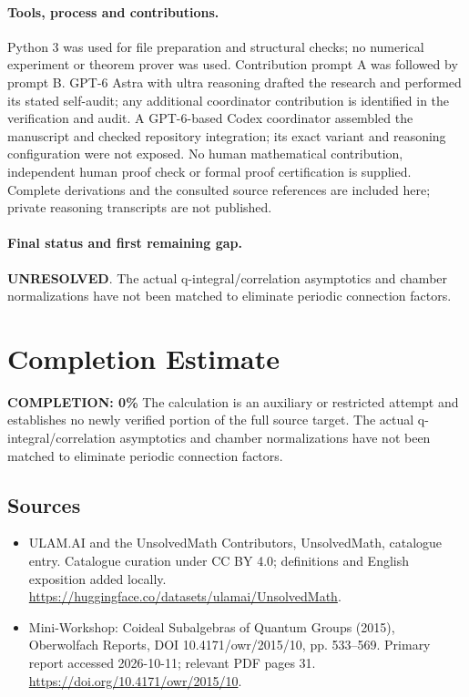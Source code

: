 \documentclass[11pt]{article}
\begin{document}
\paragraph{Tools, process and contributions.}
Python 3 was used for file preparation and structural checks; no numerical experiment or theorem prover was used. Contribution prompt A was followed by prompt B. GPT-6 Astra with ultra reasoning drafted the research and performed its stated self-audit; any additional coordinator contribution is identified in the verification and audit. A GPT-6-based Codex coordinator assembled the manuscript and checked repository integration; its exact variant and reasoning configuration were not exposed. No human mathematical contribution, independent human proof check or formal proof certification is supplied. Complete derivations and the consulted source references are included here; private reasoning transcripts are not published.

\paragraph{Final status and first remaining gap.}
\textbf{UNRESOLVED}. The actual q-integral/correlation asymptotics and chamber normalizations have not been matched to eliminate periodic connection factors.

\section{Completion Estimate}
\noindent\textbf{COMPLETION: 0\%}
The calculation is an auxiliary or restricted attempt and establishes no newly verified portion of the full source target. The actual q-integral/correlation asymptotics and chamber normalizations have not been matched to eliminate periodic connection factors.

\subsection{Sources}
\begin{itemize}
\item[\hypertarget{source:statement:1}{S1}] ULAM.AI and the UnsolvedMath Contributors, UnsolvedMath, catalogue entry. Catalogue curation under CC BY 4.0; definitions and English exposition added locally.
\url{https://huggingface.co/datasets/ulamai/UnsolvedMath}.
\item[\hypertarget{source:statement:2}{S2}] Mini-Workshop: Coideal Subalgebras of Quantum Groups (2015), Oberwolfach Reports, DOI 10.4171/owr/2015/10, pp. 533--569. Primary report accessed 2026-10-11; relevant PDF pages 31.
\url{https://doi.org/10.4171/owr/2015/10}.
\end{itemize}
\label{end:statement}
\end{document}
